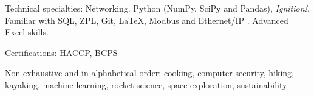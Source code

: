 \documentclass[10pt,a4paper]{article} %
\begin{document}

\inlineheadsection %
{Technical specialties:}
{Networking. Python (NumPy, SciPy and Pandas), \textit{Ignition!}.  Familiar with SQL, ZPL, Git, \LaTeX, Modbus and Ethernet/IP . Advanced Excel skills.}
 
\inlineheadsection
{Certifications:}
{HACCP, BCPS}




\spacedhrule{1.6em}{-0.4em} %



\inlineheadsection %
{Non-exhaustive and in alphabetical order:}
{cooking, computer security, hiking, kayaking, machine learning,  rocket science, space exploration, sustainability}
\end{document}

